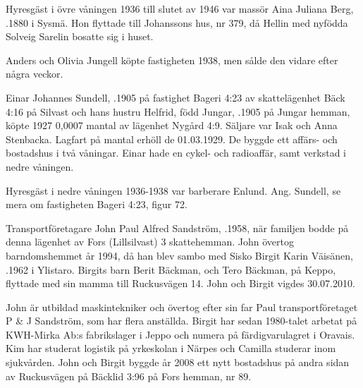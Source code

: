 Hyresgäst i övre våningen 1936 till slutet av 1946 var massör	Aina Juliana Berg, .1880 i Sysmä. Hon flyttade till Johanssons hus, nr 379, då Hellin med nyfödda Solveig Sarelin bosatte sig i huset.


Anders och Olivia Jungell köpte fastigheten 1938, men sålde den vidare efter några veckor.\jhvspace{}


Einar Johannes Sundell, .1905 på fastighet Bageri 4:23 av 	skattelägenhet Bäck 4:16 på Silvast och hans hustru Helfrid, född Jungar, .1905 på Jungar hemman, köpte 1927 0,0007 mantal av lägenhet Nygård 4:9. Säljare var Isak och Anna Stenbacka. Lagfart på mantal erhöll de 01.03.1929. De byggde ett affärs- och bostadshus i två våningar. Einar hade en cykel- och radioaffär, samt verkstad i nedre våningen.

Hyresgäst i nedre våningen 1936-1938 var barberare Enlund.
Ang. Sundell, se mera om fastigheten Bageri 4:23, figur 72.






Transportföretagare John Paul Alfred Sandström, .1958, när familjen bodde på denna lägenhet av Fors (Lillsilvast) 3 skattehemman. John övertog barndomshemmet år 1994, då han blev sambo med Sisko Birgit Karin Väisänen, .1962 i Ylistaro. Birgits barn Berit Bäckman,  och Tero Bäckman,  på Keppo, flyttade med sin mamma till Ruckusvägen 14. John och Birgit vigdes 30.07.2010.
\begin{jhchildren}
  \item {}
  \item {}
\end{jhchildren}

John är utbildad maskintekniker och övertog efter sin far Paul transportföretaget P \& J Sandström, som har flera anställda. Birgit har sedan 1980-talet arbetat på KWH-Mirka Ab:s fabrikslager i Jeppo och numera på färdigvarulagret i Oravais. Kim har studerat logistik på yrkeskolan i Närpes och Camilla studerar inom sjukvården. John och Birgit byggde år 2008 ett nytt bostadshus på andra sidan av Ruckusvägen på Bäcklid 3:96 på Fors hemman, nr 89.


